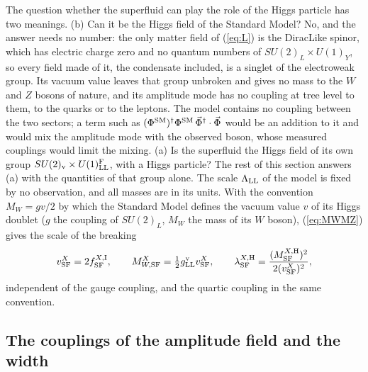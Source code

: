 \documentclass[aps,prd,onecolumn,superscriptaddress,nofootinbib,floatfix,longbibliography]{revtex4-2}
\newcommand{\LL}{{\rm LL}}
\newcommand{\SF}{{\rm SF}}
\begin{document}
The question whether the superfluid can play the role of the Higgs particle has two meanings. (b) Can it be the Higgs field
of the Standard Model? No, and the answer needs no number: the only matter field of (\ref{eq:L}) is the DiracLike spinor,
which has electric charge zero and no quantum numbers of $SU(2)_L\times U(1)_Y$, so every field made of it, the condensate
included, is a singlet of the electroweak group. Its vacuum value leaves that group unbroken and gives no mass to the $W$ and
$Z$ bosons of nature, and its amplitude mode has no coupling at tree level to them, to the quarks or to the leptons. The model
contains no coupling between the two sectors; a term such as $(\Phi^{\rm SM})^\dagger\Phi^{\rm SM}\,\vec\Phi^\dagger\cdot\vec\Phi$ would
be an addition to it and would mix the amplitude mode with the observed boson, whose measured couplings would limit the
mixing. (a) Is the superfluid the Higgs field of its own group $SU(2)_{\rm v}\times U(1)^{\rm F}_\LL$, with a Higgs particle? The
rest of this section answers (a) with the quantities of that group alone. The scale $\Lambda_\LL$ of the model is fixed by no
observation, and all masses are in its units. With the convention $M_W=gv/2$ by which the Standard Model defines the vacuum
value $v$ of its Higgs doublet ($g$ the coupling of $SU(2)_L$, $M_W$ the mass of its $W$ boson), (\ref{eq:MWMZ}) gives the scale
of the breaking
\begin{equation}
v^X_\SF=2f^{X,{\rm I}}_\SF,\qquad M^X_{W,\SF}=\tfrac12g^{\rm v}_\LL v^X_\SF,\qquad\lambda^{X,{\rm H}}_\SF=\frac{(M^{X,{\rm H}}_\SF)^2}{2(v^X_\SF)^2},
\label{eq:vSF}
\end{equation}
independent of the gauge coupling, and the quartic coupling in the same convention.

\subsection{The couplings of the amplitude field and the width}
\end{document}
